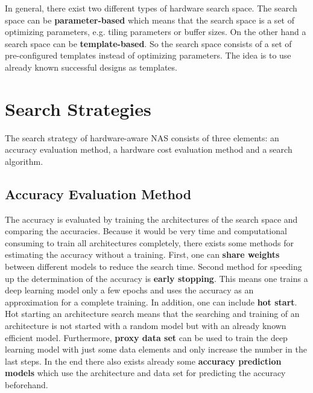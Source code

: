 \documentclass[conference]{IEEEtran}
\begin{document}
In general, there exist two different types of hardware search space. The search space can be \textbf{parameter-based} which means that the search space is a set of optimizing parameters, e.g. tiling parameters or buffer sizes. On the other hand a search space can be \textbf{template-based}. So the search space consists of a set of pre-configured templates instead of optimizing parameters. The idea is to use already known successful designs as templates.

\section{Search Strategies}
\label{section:SearchStrategy}

The search strategy of hardware-aware NAS consists of three elements: an accuracy evaluation method, a hardware cost evaluation method and a search algorithm. 

\subsection{Accuracy Evaluation Method}
The accuracy is evaluated by training the architectures of the search space and comparing the accuracies. Because it would be very time and computational consuming to train all architectures completely, there exists some methods for estimating the accuracy without a training. First, one can \textbf{share weights} between different models to reduce the search time. Second method for speeding up the determination of the accuracy is \textbf{early stopping}. This means one trains a deep learning model only a few epochs and uses the accuracy as an approximation for a complete training. In addition, one can include \textbf{hot start}. Hot starting an architecture search means that the searching and training of an architecture is not started with a random model but with an already known efficient model. Furthermore, \textbf{proxy data set} can be used to train the deep learning model with just some data elements and only increase the number in the last steps. In the end there also exists already some \textbf{accuracy prediction models} which use the architecture and data set for predicting the accuracy beforehand. 
\end{document}
